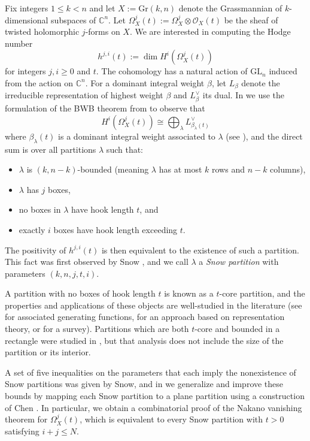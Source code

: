 \documentclass{amsart}
\newcommand\Gr{\mathrm{Gr}}
\theoremstyle{plain}
\theoremstyle{definition}
\numberwithin{equation}{section}
\begin{document}
Fix integers $1\leq k< n$ and let $X:=\Gr(k,n)$ denote the Grassmannian of $k$-dimensional subspaces of $\mathbb{C}^n$. Let $\Omega_X^j(t):=\Omega^j_X\otimes\mathcal{O}_X(t)$ be the sheaf of twisted holomorphic $j$-forms on $X$. We are interested in computing the Hodge number
\[h^{j,i}(t):=\dim H^i(\Omega_X^j(t))\]
for integers $j,i\geq 0$ and $t$. The cohomology has a natural action of $\mathrm{GL}_n$ induced from the action on $\mathbb{C}^n$. For a dominant integral weight $\beta$, let $L_\beta$ denote the irreducible representation of highest weight $\beta$ and $L_\beta^\vee$ its dual. In  we use the formulation of the BWB theorem from \cite[\S4.1]{Wey03} to observe that
\[H^i(\Omega_X^j(t))\cong\bigoplus_\lambda L_{\beta_\lambda(t)}^\vee\]
where $\beta_\lambda(t)$ is a dominant integral weight associated to $\lambda$ (see ), and the direct sum is over all partitions $\lambda$ such that:
\begin{itemize}
\item $\lambda$ is $(k,n-k)$-bounded (meaning $\lambda$ has at most $k$ rows and $n-k$ columns),
\item $\lambda$ has $j$ boxes,
\item no boxes in $\lambda$ have hook length $t$, and
\item exactly $i$ boxes have hook length exceeding $t$.
\end{itemize}
The positivity of $h^{j,i}(t)$ is then equivalent to the existence of such a partition. This fact was first observed by Snow \cite{Sno86}, and we call $\lambda$ a \emph{Snow partition} with parameters $(k,n,j,t,i)$.

A partition with no boxes of hook length $t$ is known as a $t$-core partition, and the properties and applications of these objects are well-studied in the literature (see \cite{GKS90} for associated generating functions, \cite{GrOn96} for an approach based on representation theory, or \cite{Cho21} for a survey). Partitions which are both $t$-core and bounded in a rectangle were studied in \cite{Ayyer24}, but that analysis does not include the size of the partition or its interior.

A set of five inequalities on the parameters that each imply the nonexistence of Snow partitions was given by Snow, and in  we generalize and improve these bounds by mapping each Snow partition to a plane partition using a construction of Chen \cite{Chen10}. In particular, we obtain a combinatorial proof of the Nakano vanishing theorem \cite{Nak54} for $\Omega_X^j(t)$, which is equivalent to every Snow partition with $t>0$ satisfying $i+j\leq N$.
\end{document}
